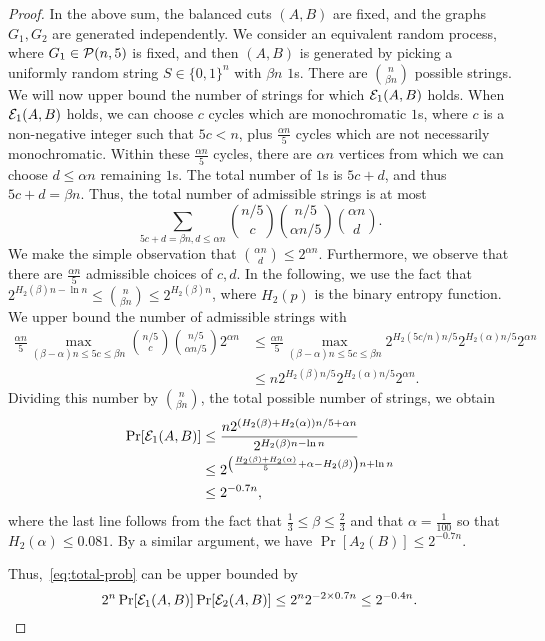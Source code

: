 \begin{proof}
In the above sum, the balanced cuts $(A,B)$ are fixed, and the graphs $G_1, G_2$ are generated independently. We consider an equivalent random process, where $G_1 \in \mathcal{P}(n,5)$ is fixed, and then $(A,B)$ is generated by picking a uniformly random string $S \in \{0,1\}^n$ with $\beta n$ $1$s. There are $\binom{n}{\beta n}$ possible strings. We will now upper bound the number of strings for which $\mathcal{E}_1(A,B)$ holds. When $\mathcal{E}_1(A,B)$ holds, we can choose $c$ cycles which are monochromatic $1$s, where $c$ is a non-negative integer such that $5c < n$, plus $\frac{\alpha n}{5}$ cycles which are not necessarily monochromatic. Within these $\frac{\alpha n}{5}$ cycles, there are $\alpha n$ vertices from which we can choose $d \leq \alpha n$ remaining $1$s. The total number of $1$s is $5c + d$, and thus $5c + d = \beta n$. Thus, the total number of admissible strings is at most 
\[
    \sum_{5c + d = \beta n, d \leq \alpha n}\binom{n/5}{c} \binom{n/5}{\alpha n / 5} \binom{\alpha n}{d}.
\]
We make the simple observation that $\binom{\alpha n}{d} \leq 2^{\alpha n}$. Furthermore, we observe that there are $\frac{\alpha n}{5}$ admissible choices of $c,d$. In the following, we use the fact that $2^{H_2(\beta) n - \ln n} \leq \binom{n}{\beta n} \leq 2^{H_2(\beta) n}$, where $H_2(p)$ is the binary entropy function. We upper bound the number of admissible strings with
\begin{align*}
    \frac{\alpha n}{5} \max_{(\beta-\alpha) n \leq 5c \leq \beta n} \binom{n/5}{c} \binom{n/5}{\alpha n / 5} 2^{\alpha n} &\leq 
    \frac{\alpha n}{5} \max_{(\beta - \alpha) n \leq 5c \leq \beta n} 2^{H_2(5c/n)n/5} 2^{H_2(\alpha)n/5}2^{\alpha n} \\ 
    &\leq n 2^{H_2(\beta)n/5} 2^{H_2(\alpha)n/5} 2^{\alpha n}.
\end{align*}
Dividing this number by $\binom{n}{\beta n}$, the total possible number of strings, we obtain
\begin{align*}
    \Pr[\mathcal{E}_1(A,B)] &\leq \frac{n 2^{(H_2(\beta) + H_2(\alpha)) n / 5 + \alpha n}}{2^{H_2(\beta)n - \ln n}} \\
    &\leq 2^{\left(\frac{H_2(\beta) + H_2(\alpha)}{5} + \alpha - H_2(\beta) \right) n  + \ln n } \\
    &\leq 2^{-0.7 n},
\end{align*}
where the last line follows from the fact that $\frac{1}{3} \leq \beta \leq \frac{2}{3}$ and that $\alpha = \frac{1}{100}$ so that $H_2(\alpha) \leq 0.081$.
By a similar argument, we have $\Pr[A_2(B)] \leq 2^{-0.7 n}$.

Thus,~\eqref{eq:total-prob} can be upper bounded by
\[
    2^{n} \Pr[\mathcal{E}_1(A,B)] \Pr[\mathcal{E}_2(A,B)] \leq 2^{n} 2^{-2 \times 0.7 n} \leq 2^{-0.4n}.
\]

\end{proof}


